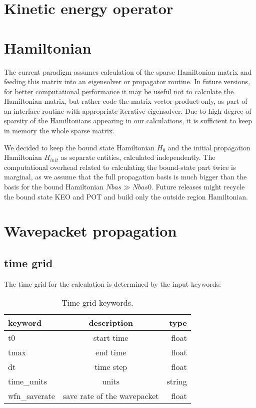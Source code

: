 \documentclass[a4paper,american,floatfix,pdftex,superscriptaddress,twoside,%
aps,pra,
linenumbers,%
reprint,%
]{revtex4-2}%
\begin{document}
\section{Kinetic energy operator}

\section{Hamiltonian}
The current paradigm assumes calculation of the sparse Hamiltonian matrix and feeding this matrix into an eigensolver or propagator routine. In future versions, for better computational performance it may be useful not to calculate the Hamiltonian matrix, but rather code the matrix-vector product only, as part of an interface routine with appropriate iterative eigensolver.
Due to high degree of sparsity of the Hamiltonians appearing in our calculations, it is sufficient to keep in memory the whole sparse matrix.

We decided to keep the bound state Hamiltonian $H_0$ and the initial propagation Hamiltonian $H_{init}$ as separate entities, calculated independently. The computational overhead related to calculating the bound-state part twice is marginal, as we assume that the full propagation basis is much bigger than the basis for the bound Hamiltonian $Nbas \gg Nbas0$. Future releases might recycle the bound state KEO and POT and build only the outside region Hamiltonian.

\section{Wavepacket propagation}
\subsection{time grid}
The time grid for the calculation is determined by the input keywords:
\begin{table}[h!]
	\begin{center}
		\caption{Time grid keywords.}
		\label{tab:time-grids}
		\begin{tabular}{l|c|r}
			\textbf{keyword} & \textbf{description} & \textbf{type}\\
			\hline
			t0 & start time & float\\
			tmax & end time & float\\
			dt & time step & float\\
			time\_units & units & string \\
			wfn\_saverate & save rate of the wavepacket  & float \\
			
		\end{tabular}
	\end{center}
\end{table}
\end{document}
